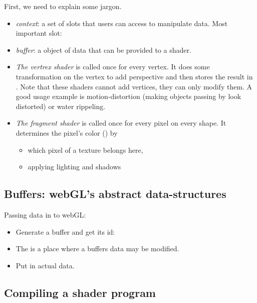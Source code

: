 First, we need to explain some jargon. 
\begin{itemize}
    \item \emph{context}: a set of slots that users can access to manipulate data. Most important slot: 
    
    \item \emph{buffer}: a object of data that can be provided to a shader.

    \item \emph{The vertrex shader} is called once for every vertex. It does some transformation on the vertex to add perspective and then stores the result in . 
    Note that these shaders cannot add vertices, they can only modify them. A good usage example is motion-distortion (making objects passing by look distorted) or water rippeling.
    
    \item \emph{The fragment shader} is called once for every pixel on every shape. It determines the pixel's color () by
    \begin{itemize}
        \item which pixel of a texture belongs here, 
        \item applying lighting and shadows
    \end{itemize} 
\end{itemize}



\subsection{Buffers: webGL's abstract data-structures}

Passing data in to webGL: 
\begin{itemize}
    \item Generate a buffer and get its id: 
    \item The  is a place where a buffers data may be modified. 
    \item Put in actual data. 
\end{itemize}


\subsection{Compiling a shader program}

